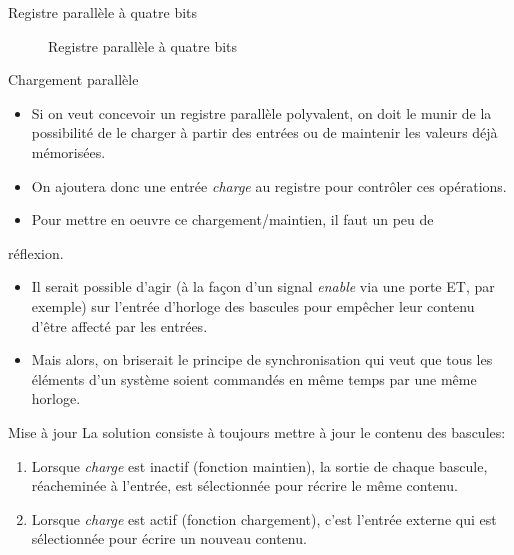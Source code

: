 \documentclass[presentation]{beamer}
\begin{document}
\begin{frame}[label={sec:org96ae202}]{Registre parallèle à quatre bits}
\begin{figure}[htbp]
\centering

\caption{\label{fig:org0fd6bdd}Registre parallèle à quatre bits}
\end{figure}
\end{frame}

\begin{frame}[label={sec:org2cc2340}]{Chargement parallèle}
\begin{itemize}
\item Si on veut concevoir un registre parallèle polyvalent, on doit le munir de la possibilité de le charger à partir des entrées ou de maintenir les valeurs déjà mémorisées.

\item On ajoutera donc une entrée \emph{charge} au registre pour contrôler ces opérations.

\item Pour mettre en oeuvre ce chargement/maintien, il faut un peu de
\end{itemize}
réflexion.

\begin{itemize}
\item Il serait possible d'agir (à la façon d'un signal \emph{enable} via une porte ET, par exemple) sur l'entrée d'horloge des bascules pour empêcher leur contenu d'être affecté par les entrées.

\item Mais alors, on briserait le principe de synchronisation qui veut que tous les éléments d'un système soient commandés en même temps par une même horloge.
\end{itemize}
\end{frame}

\begin{frame}[label={sec:orge2badda}]{Mise à jour}
La solution consiste à toujours mettre à jour le contenu des bascules: 

\begin{enumerate}
\item Lorsque \emph{charge} est inactif (fonction maintien), la sortie de chaque bascule, réacheminée à l'entrée, est sélectionnée pour récrire le même contenu.
\item Lorsque \emph{charge} est actif (fonction chargement), c'est l'entrée externe qui est sélectionnée pour écrire un nouveau contenu.
\end{enumerate}
\end{frame}
\end{document}
